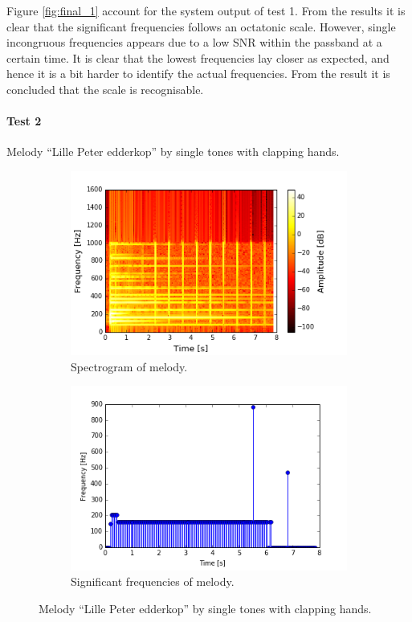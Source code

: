 Figure \ref{fig:final_1} account for the system output of test 1. From the results it is clear that the significant frequencies follows an octatonic scale. However, single incongruous frequencies appears due to a low SNR within the passband at a certain time.
It is clear that the lowest frequencies lay closer as expected, and hence it is a bit harder to identify the actual frequencies. From the result it is concluded that the scale is recognisable.

\paragraph{Test 2} Melody ``Lille Peter edderkop'' by single tones with clapping hands.  
\begin{figure}[H]
\centering
\begin{subfigure}{0.49\textwidth}
\centering
\includegraphics[width=\textwidth]{figures/validation/systemtest/final_spec3.png}
\caption{Spectrogram of melody.}
\label{fig:final_spec2}
\end{subfigure}
\begin{subfigure}{0.49\textwidth}
\centering
\includegraphics[width=\textwidth]{figures/validation/systemtest/final_peak3.png}
\caption{Significant frequencies of melody.}
\label{fig:final_peak3}
\end{subfigure}
\caption{Melody ``Lille Peter edderkop'' by single tones with clapping hands.}
\label{fig:final_3}
\end{figure}  

